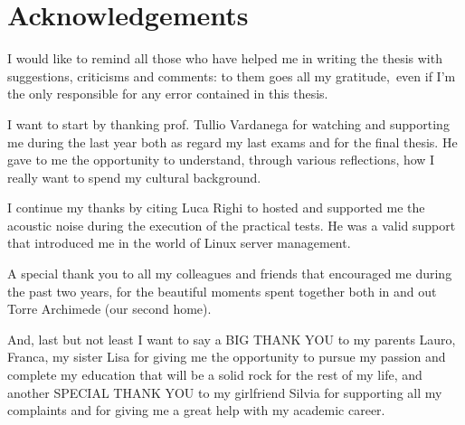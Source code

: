 %
%
\chapter*{Acknowledgements}
I would like to remind all those who have helped me in writing the thesis with suggestions, criticisms
and comments: to them goes all my gratitude, even if I'm the only responsible for any error contained
in this thesis.

I want to start by thanking prof. Tullio Vardanega for watching and supporting me during the last year
both as regard my last exams and for the final thesis. He gave to me the opportunity to understand,
through various reflections, how I really want to spend my cultural background.

I continue my thanks by citing Luca Righi to hosted and supported me the acoustic noise during the
execution of the practical tests. He was a valid support that introduced me in the world of Linux
server management.

A special thank you to all my colleagues and friends that encouraged me during the past two years,
for the beautiful moments spent together both in and out Torre Archimede (our second home).

And, last but not least I want to say a BIG THANK YOU to my parents Lauro, Franca, my sister Lisa
for giving me the opportunity to pursue my passion and complete my education that will be a solid
rock for the rest of my life, and another SPECIAL THANK YOU to my girlfriend Silvia for supporting all
my complaints and for giving me a great help with my academic career.